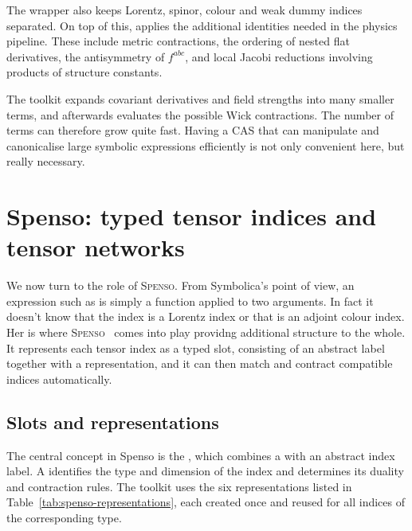 The wrapper also keeps Lorentz, spinor, colour and weak dummy indices separated. On top of this,  applies the additional identities needed in the physics pipeline. These include metric contractions, the ordering of nested flat derivatives, the antisymmetry of \(f^{abc}\), and local Jacobi reductions involving products of structure constants.

\begin{tcolorbox}[infobox, title={Why a fast CAS matters here}]
The toolkit expands covariant derivatives and field strengths into many smaller terms, and afterwards evaluates the possible Wick contractions. The number of terms can therefore grow quite fast. Having a CAS that can manipulate and canonicalise large symbolic expressions efficiently is not only convenient here, but really necessary.
\end{tcolorbox}


\section{Spenso: typed tensor indices and tensor networks}
\label{sec:cas-spenso}

We now turn to the role of \textsc{Spenso}. From Symbolica's point of view, an expression such as  is simply a function applied to two arguments. In fact it doesn't know that the index  is a Lorentz index or that  is an adjoint colour index. Her is where \textsc{Spenso}~\cite{spenso} comes into play providng additional structure to the whole. It represents each tensor index as a typed slot, consisting of an abstract label together with a representation, and it can then match and contract compatible indices automatically.

\subsection*{Slots and representations}

The central concept in Spenso is the , which combines a  with an abstract index label. A  identifies the type and dimension of the index and determines its duality and contraction rules. The toolkit uses the six representations listed in Table~\ref{tab:spenso-representations}, each created once and reused for all indices of the corresponding type.

